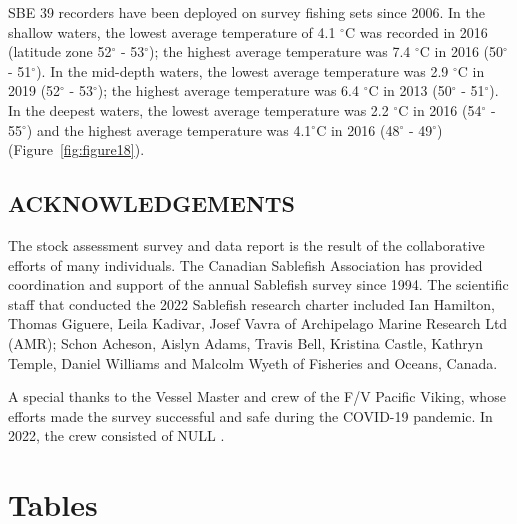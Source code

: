 \documentclass[12pt]{article}\usepackage[]{graphicx}\usepackage[]{color}
\begin{document}
SBE 39 recorders have been deployed on survey fishing sets since 2006. In the shallow waters, the lowest average temperature of 4.1 \(^\circ\)C was recorded in 2016 (latitude zone 52\(^\circ\) - 53\(^\circ\)); the highest average temperature was 7.4 \(^\circ\)C in 2016 (50\(^\circ\) - 51\(^\circ\)). In the mid-depth waters, the lowest average temperature was 2.9 \(^\circ\)C in 2019 (52\(^\circ\) - 53\(^\circ\)); the highest average temperature was 6.4 \(^\circ\)C in 2013 (50\(^\circ\) - 51\(^\circ\)). In the deepest waters, the lowest average temperature was 2.2 \(^\circ\)C in 2016 (54\(^\circ\) - 55\(^\circ\)) and the highest average temperature was 4.1\(^\circ\)C in 2016 (48\(^\circ\) - 49\(^\circ\)) (Figure~\ref{fig:figure18}).

\hypertarget{acknowledgements}{%
\subsection{ACKNOWLEDGEMENTS}\label{acknowledgements}}

The stock assessment survey and data report is the result of the collaborative efforts of many individuals. The Canadian Sablefish Association has provided coordination and support of the annual Sablefish survey since 1994. The scientific staff that conducted the 2022 Sablefish research charter included Ian Hamilton, Thomas Giguere, Leila Kadivar, Josef Vavra of Archipelago Marine Research Ltd (AMR); Schon Acheson, Aislyn Adams, Travis Bell, Kristina Castle, Kathryn Temple, Daniel Williams and Malcolm Wyeth of Fisheries and Oceans, Canada.

A special thanks to the Vessel Master and crew of the F/V Pacific Viking, whose efforts made the survey successful and safe during the COVID-19 pandemic. In 2022, the crew consisted of NULL .

\clearpage

\hypertarget{tables}{%
\section{Tables}\label{tables}}
\end{document}

